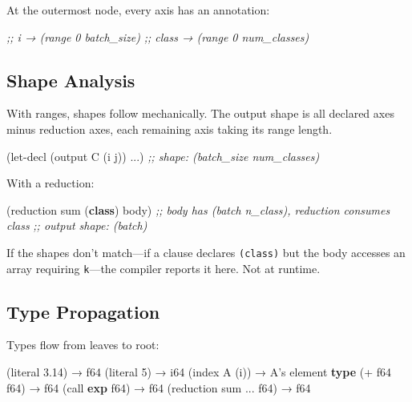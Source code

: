 \documentclass[11pt,titlepage]{article}
\newenvironment{Shaded}{}{}
\newcommand{\CommentTok}[1]{\textcolor[rgb]{0.38,0.63,0.69}{\textit{#1}}}
\newcommand{\DecValTok}[1]{\textcolor[rgb]{0.25,0.63,0.44}{#1}}
\newcommand{\FloatTok}[1]{\textcolor[rgb]{0.25,0.63,0.44}{#1}}
\newcommand{\KeywordTok}[1]{\textcolor[rgb]{0.00,0.44,0.13}{\textbf{#1}}}
\newcommand{\NormalTok}[1]{#1}
\newcommand{\OperatorTok}[1]{\textcolor[rgb]{0.40,0.40,0.40}{#1}}
\begin{document}
At the outermost node, every axis has an annotation:

\begin{Shaded}
\begin{Highlighting}[]
\CommentTok{;; i     → (range 0 batch_size)}
\CommentTok{;; class → (range 0 num_classes)}
\end{Highlighting}
\end{Shaded}

\vspace{2em}

\hypertarget{shape-analysis}{%
\subsection{Shape Analysis}\label{shape-analysis}}

With ranges, shapes follow mechanically. The output shape is all
declared axes minus reduction axes, each remaining axis taking its range
length.

\begin{Shaded}
\begin{Highlighting}[]
\NormalTok{(let-decl (output C (i j)) ...)}
\CommentTok{;; shape: (batch_size num_classes)}
\end{Highlighting}
\end{Shaded}

With a reduction:

\begin{Shaded}
\begin{Highlighting}[]
\NormalTok{(reduction sum (}\KeywordTok{class}\NormalTok{) body)}
\CommentTok{;; body has (batch n_class), reduction consumes class}
\CommentTok{;; output shape: (batch)}
\end{Highlighting}
\end{Shaded}

If the shapes don't match---if a clause declares \texttt{(class)} but
the body accesses an array requiring \texttt{k}---the compiler reports
it here. Not at runtime.

\vspace{2em}

\hypertarget{type-propagation}{%
\subsection{Type Propagation}\label{type-propagation}}

Types flow from leaves to root:

\begin{Shaded}
\begin{Highlighting}[]
\NormalTok{(literal }\FloatTok{3.14}\NormalTok{)   → f64}
\NormalTok{(literal }\DecValTok{5}\NormalTok{)      → i64}
\NormalTok{(index A (i))    → A's element }\KeywordTok{type}
\NormalTok{(}\OperatorTok{+}\NormalTok{ f64 f64)      → f64}
\NormalTok{(call }\KeywordTok{exp}\NormalTok{ f64)   → f64}
\NormalTok{(reduction sum ... f64) → f64}
\end{Highlighting}
\end{Shaded}
\end{document}
